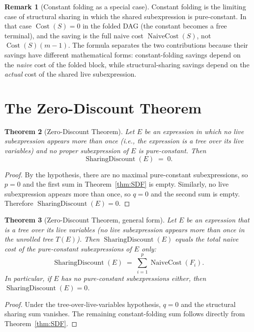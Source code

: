 \documentclass[12pt,a4paper]{article}
\newtheorem{theorem}{Theorem}[section]
\theoremstyle{definition}
\newtheorem{remark}[theorem]{Remark}
\newcommand{\Cost}{\operatorname{Cost}}
\newcommand{\NC}{\operatorname{NaiveCost}}
\newcommand{\SD}{\operatorname{SharingDiscount}}
\begin{document}
\begin{remark}[Constant folding as a special case]
Constant folding is the limiting case of structural sharing in which the
shared subexpression is pure-constant.  In that case $\Cost(S) = 0$ in the
folded DAG (the constant becomes a free terminal), and the saving is the
full naive cost $\NC(S)$, not $\Cost(S)(m-1)$.  The formula separates the
two contributions because their savings have different mathematical forms:
constant-folding savings depend on the \emph{naive} cost of the folded
block, while structural-sharing savings depend on the \emph{actual} cost
of the shared live subexpression.
\end{remark}

\section{The Zero-Discount Theorem}
\label{sec:zero}

\begin{theorem}[Zero-Discount Theorem]
\label{thm:zero}
Let $E$ be an expression in which no live subexpression appears more than
once (i.e., the expression is a tree over its live variables) and no
proper subexpression of $E$ is pure-constant.  Then
\[
  \SD(E) \;=\; 0.
\]
\end{theorem}

\begin{proof}
By the hypothesis, there are no maximal pure-constant subexpressions, so
$p = 0$ and the first sum in Theorem~\ref{thm:SDF} is empty.  Similarly,
no live subexpression appears more than once, so $q = 0$ and the second
sum is empty.  Therefore $\SD(E) = 0$.
\end{proof}

\begin{theorem}[Zero-Discount Theorem, general form]
\label{thm:zero-general}
Let $E$ be an expression that is a tree over its live variables (no live
subexpression appears more than once in the unrolled tree $T(E)$).  Then
$\SD(E)$ equals the total naive cost of the pure-constant subexpressions
of $E$ only:
\[
  \SD(E) \;=\; \sum_{i=1}^{p} \NC(F_i).
\]
In particular, if $E$ has no pure-constant subexpressions either, then
$\SD(E) = 0$.
\end{theorem}

\begin{proof}
Under the tree-over-live-variables hypothesis, $q = 0$ and the structural
sharing sum vanishes.  The remaining constant-folding sum follows directly
from Theorem~\ref{thm:SDF}.
\end{proof}
\end{document}
